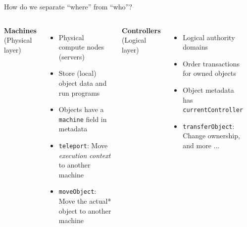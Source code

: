 \documentclass[handout,aspectratio=169,xcolor=dvipsnames,10pt]{beamer}
\begin{document}
\begin{frame}[fragile]{How do we separate ``where'' from ``who''?}

\begin{columns}[T]

\textbf{Machines} (Physical layer)
\begin{itemize}\small
  \item Physical compute nodes (servers)
  \item Store (local) object data and run programs
  \item Objects have a \lstinline{machine} field in metadata
  \item \lstinline{teleport}: Move \textit{execution context} to another machine
  \item \lstinline{moveObject}: Move the actual* object to another machine
\end{itemize}

\vspace{0.8em}

\textbf{Controllers} (Logical layer)
\begin{itemize}\small
  \item Logical authority domains
  \item Order transactions for owned objects
  \item Object metadata has \lstinline{currentController}
  \item \lstinline{transferObject}: Change ownership, and more ...
\end{itemize}

\vfill
\vspace{0.5em}

\begin{center}
\end{center}
\end{columns}
\end{frame}
\end{document}
